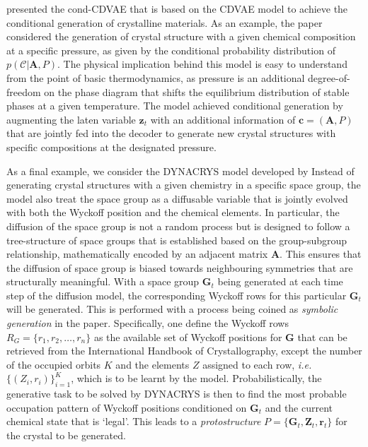 \citet{luo2024deep} presented the cond-\textsc{CDVAE} that is based on the CDVAE model\cite{xie2018crystal} to achieve the conditional generation of crystalline materials. As an example, the paper considered the generation of crystal structure with a given chemical composition at a specific pressure, as given by the conditional probability distribution of $p(\mathcal{C}|\bm{A},P)$. The physical implication behind this model is easy to understand from the point of basic thermodynamics, as pressure is an additional degree-of-freedom on the phase diagram that shifts the equilibrium distribution of stable phases at a given temperature. The model achieved conditional generation by augmenting the laten variable $\bm{z}_t$ with an additional information of $\bm{c}=(\bm{A},P)$ that are jointly fed into the decoder to generate new crystal structures with specific compositions at the designated pressure.

As a final example, we consider the \textsc{DYNACRYS} model developed by \citet{jin2026dynacrys} Instead of generating crystal structures with a given chemistry in a specific space group, the model also treat the space group as a diffusable variable that is jointly evolved with both the Wyckoff position and the chemical elements. In particular, the diffusion of the space group is not a random process but is designed to follow a tree-structure of space groups that is established based on the group-subgroup relationship, mathematically encoded by an adjacent matrix $\bm{A}$. This ensures that the diffusion of space group is biased towards neighbouring symmetries that are structurally meaningful. With a space group $\bm{G}_t$ being generated at each time step of the diffusion model, the corresponding Wyckoff rows for this particular  $\bm{G}_t$ will be generated. This is performed with a process being coined as \textit{symbolic generation} in the paper. Specifically, one define the Wyckoff rows $R_{G}=\{r_1,r_2,\ldots,r_{n}\}$ as the available set of Wyckoff positions for $\bm{G}$ that can be retrieved from the International Handbook of Crystallography, except the number of the occupied orbits $K$ and the elements $Z$ assigned to each row, \emph{i.e.} $\{(Z_i,r_i)\}_{i=1}^{K}$, which is to be learnt by the model. Probabilistically, the generative task to be solved by \textsc{DYNACRYS} is then to find the most probable occupation pattern of Wyckoff positions conditioned on $\bm{G}_t$ and the current chemical state that is `legal'. This leads to a \emph{protostructure} $P=\{\bm{G}_t,\bm{Z}_t,\bm{r}_t\}$ for the crystal to be generated.

